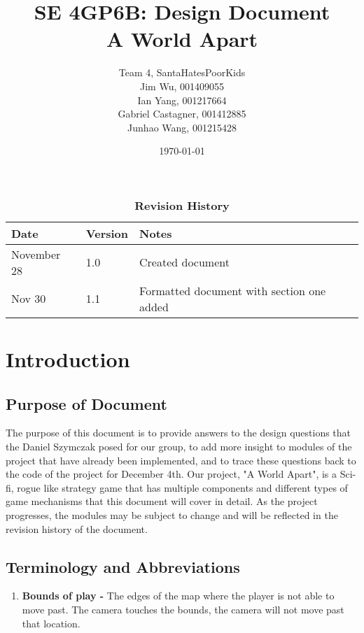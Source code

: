 \documentclass[12pt, titlepage]{article}
\title{SE 4GP6B: Design Document\\A World Apart}
\author{Team 4, SantaHatesPoorKids
		\\ Jim Wu, 001409055
		\\ Ian Yang, 001217664
		\\ Gabriel Castagner, 001412885
		\\ Junhao Wang, 001215428
}
\date{\today}
\begin{document}
\maketitle

\tableofcontents
\listoftables
\listoffigures

\begin{table}[bp]
\caption{\bf Revision History}
\begin{tabularx}{\textwidth}{p{3cm}p{2cm}X}
\toprule {\bf Date} & {\bf Version} & {\bf Notes}\\
\midrule
November 28 & 1.0 & Created document\\
Nov 30 & 1.1 & Formatted document with section one added\\

\bottomrule
\end{tabularx}
\end{table}

\newpage


\section{Introduction}
\subsection{Purpose of Document}
The purpose of this document is to provide answers to the design questions that the Daniel Szymczak posed for our group, to add more insight to modules of the project that have already been implemented, and to trace these questions back to the code of the project for December 4th.
Our project, "A World Apart", is a Sci-fi, rogue like strategy game that has multiple components and different types of game mechanisms that this document will cover in detail. As the project progresses, the modules may be subject to change and will be reflected in the revision history of the document.
\subsection{Terminology and Abbreviations}
\begin{enumerate}
	\item \textbf{ Bounds of play - } The edges of the map where the player is not able to move past. The camera touches the bounds, the camera will not move past that location. 
\end{enumerate}
\end{document}
